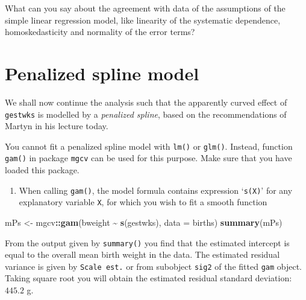 \documentclass[
]{book}
\newenvironment{Shaded}{\begin{snugshade}}{\end{snugshade}}
\newcommand{\AttributeTok}[1]{\textcolor[rgb]{0.13,0.29,0.53}{#1}}
\newcommand{\FunctionTok}[1]{\textcolor[rgb]{0.13,0.29,0.53}{\textbf{#1}}}
\newcommand{\NormalTok}[1]{#1}
\newcommand{\OtherTok}[1]{\textcolor[rgb]{0.56,0.35,0.01}{#1}}
\newcommand{\SpecialCharTok}[1]{\textcolor[rgb]{0.81,0.36,0.00}{\textbf{#1}}}
\providecommand{\tightlist}{%
  \setlength{\itemsep}{0pt}\setlength{\parskip}{0pt}}
\begin{document}
What can you say about the agreement with data of the assumptions of the
simple linear regression model,
like linearity of the systematic dependence,
homoskedasticity and normality of the error terms?

\section{Penalized spline model}\label{penalized-spline-model}

We shall now continue the analysis such that the apparently curved effect
of \texttt{gestwks} is modelled by a \emph{penalized spline},
based on the recommendations of Martyn in his lecture today.

You cannot fit a penalized spline model with \texttt{lm()} or
\texttt{glm()}. Instead, function \texttt{gam()} in package
\texttt{mgcv} can be used for this purpose. Make sure that you have loaded
this package.

\begin{enumerate}
\def\labelenumi{\arabic{enumi}.}
\tightlist
\item
  When calling \texttt{gam()}, the model formula contains
  expression `\texttt{s(X)}' for any explanatory variable \texttt{X},
  for which you wish to fit a smooth function
\end{enumerate}

\begin{Shaded}
\begin{Highlighting}[]
\NormalTok{mPs }\OtherTok{\textless{}{-}}\NormalTok{ mgcv}\SpecialCharTok{::}\FunctionTok{gam}\NormalTok{(bweight }\SpecialCharTok{\textasciitilde{}} \FunctionTok{s}\NormalTok{(gestwks), }\AttributeTok{data =}\NormalTok{ births)}
\FunctionTok{summary}\NormalTok{(mPs)}
\end{Highlighting}
\end{Shaded}

From the output given by \texttt{summary()} you find that the
estimated intercept is equal to the overall mean birth
weight in the data. The estimated residual variance is given by
\texttt{Scale\ est.} or from subobject \texttt{sig2} of the fitted
\texttt{gam} object. Taking square root you will obtain the estimated
residual standard deviation: \(445.2\) g.

\begin{Shaded}
\end{Shaded}
\end{document}
